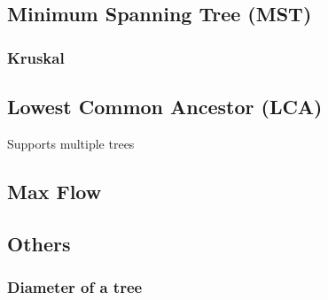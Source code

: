 \documentclass[../Notes/main.tex]{subfiles}
\begin{document}
\subsection{Minimum Spanning Tree (MST)}

\subsubsection{Kruskal}


% 

\subsection{Lowest Common Ancestor (LCA)}
Supports multiple trees





\subsection{Max Flow}


% 

\subsection{Others}
\subsubsection{Diameter of a tree}

\end{document}
